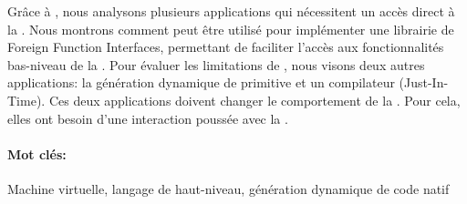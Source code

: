 \documentclass[a4paper,11pt,twoside]{include/ThesisStyle}
\begin{document}
Grâce à \B, nous analysons plusieurs applications qui nécessitent un accès direct à la \VM.
Nous montrons comment \B peut être utilisé pour implémenter une librairie de Foreign Function Interfaces, permettant de faciliter l’accès aux fonctionnalités bas-niveau de la \VM.
Pour évaluer les limitations de \B, nous visons deux autres applications: la génération dynamique de primitive et un compilateur \JIT (Just-In-Time).
Ces deux applications doivent changer le comportement de la \VM.
Pour cela, elles ont besoin d’une interaction poussée avec la \VM.

\paragraph{Mot clés:} Machine virtuelle, langage de haut-niveau, génération dynamique de code natif
 
\renewcommand{\baselinestretch}{1}\normalsize
\tableofcontents

\renewcommand{\baselinestretch}{1.2}\normalsize
\mainmatter
{}



%











\appendix



\thispagestyle{empty}
\end{document}
